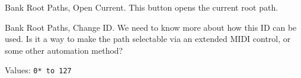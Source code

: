    Bank Root Paths, Open Current.
   This button opens the current root path.

   Bank Root Paths, Change ID.
   We need to know more about how this ID can be used.
   Is it a way to make the path selectable via an extended MIDI control, or
   some other automation method?

   Values: \texttt{0* to 127}

